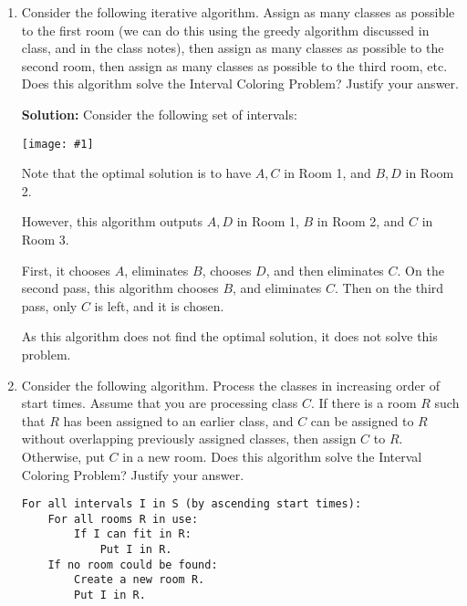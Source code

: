 \documentclass{article}
\providecommand{\soln}{\textbf{Solution: }}
\providecommand{\image}[1]{
    \begin{center}
        \texttt{[image: \#1]}
    \end{center}
}
\begin{document}
    \begin{enumerate}[label=\Alph*.]
        \item Consider the following iterative algorithm. Assign as many classes as possible to the first room (we can do this using the greedy algorithm discussed in class, and in the class notes), then assign as many classes as possible to the second room, then assign as many classes as possible to the third room, etc. Does this algorithm solve the Interval Coloring Problem? Justify your answer.
        
        \soln Consider the following set of intervals:
        
        \image{p2a_counterexample}
        
        Note that the optimal solution is to have $A,C$ in Room 1, and $B, D$ in Room 2.
        
        However, this algorithm outputs $A, D$ in Room 1, $B$ in Room 2, and $C$ in Room 3.
        
        First, it chooses $A$, eliminates $B$, chooses $D$, and then eliminates $C$. On the second pass, this algorithm chooses $B$, and eliminates $C$.
        Then on the third pass, only $C$ is left, and it is chosen.
        
        As this algorithm does not find the optimal solution, it does not solve this problem.
        
        \item Consider the following algorithm. Process the classes in increasing order of start times. Assume that you are processing class $C$. If there is a room $R$ such that $R$ has been assigned to an earlier class, and $C$ can be assigned to $R$ without overlapping previously assigned classes, then assign $C$ to $R$. Otherwise, put $C$ in a new room. Does this algorithm solve the Interval Coloring Problem?
        Justify your answer.
        
        
        \begin{lstlisting}
For all intervals I in S (by ascending start times):
    For all rooms R in use:
        If I can fit in R:
            Put I in R.
    If no room could be found:
        Create a new room R.
        Put I in R.
        \end{lstlisting}
    \end{enumerate}
    
\end{document}
